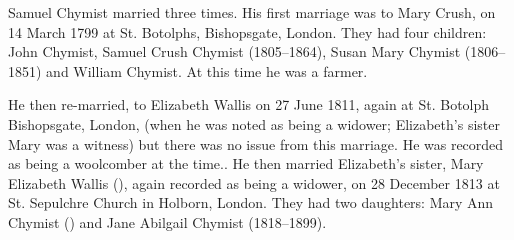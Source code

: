 

Samuel Chymist married three times. His first marriage was to Mary Crush, on 14 March 1799 at St. Botolphs, Bishopsgate, London. They had four children: John Chymist, Samuel Crush Chymist (1805--1864), Susan Mary Chymist (1806--1851) and William Chymist.  At this time he was a farmer. \cite{SChymistMarriage}

He then re-married, to Elizabeth Wallis on 27 June 1811, again at St. Botolph Bishopsgate, London, (when he was noted as being a widower; Elizabeth's sister Mary was a witness) but there was no issue from this marriage.  He was recorded as being a woolcomber at the time.\cite{SChymistMarriage2}.  He then married Elizabeth's sister, Mary Elizabeth Wallis (), again recorded as being a widower, on 28 December 1813 at St. Sepulchre Church in Holborn, London.\cite{SChymistMarriage3} They had two daughters: Mary Ann Chymist () and Jane Abilgail Chymist (1818--1899).

